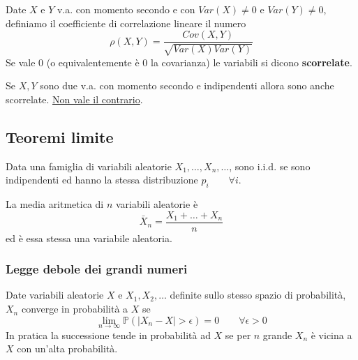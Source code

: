 \begin{definition}
	Date $X$ e $Y$ v.a. con momento secondo e con $Var(X) \neq 0$ e $Var(Y) \neq 0$, definiamo il coefficiente di correlazione lineare il numero
	\begin{equation}
		\rho(X,Y) = \frac{Cov(X,Y)}{\sqrt{Var(X)Var(Y)}}
	\end{equation}
	Se vale $0$ (o equivalentemente è $0$ la covarianza) le variabili si dicono \textbf{scorrelate}.
\end{definition}

\begin{proposition}
	Se $X,Y$ sono due v.a. con momento secondo e indipendenti allora sono anche scorrelate. \underline{Non vale il contrario}.
\end{proposition}

\subsection{Teoremi limite}
\begin{definition}
	Data una famiglia di variabili aleatorie $X_1, \ldots, X_n, \ldots$, sono i.i.d. se sono indipendenti ed hanno la stessa distribuzione $p_i \qquad \forall i$.
\end{definition}

\begin{definition}
	La media aritmetica di $n$ variabili aleatorie è
	\begin{equation}
		\bar{X}_n = \frac{X_1 + \ldots + X_n}{n}
	\end{equation}
	ed è essa stessa una variabile aleatoria.
\end{definition}

\subsubsection{Legge debole dei grandi numeri}
\begin{proposition}
	Date variabili aleatorie $X$ e $X_1, X_2, \ldots$ definite sullo stesso spazio di probabilità, $X_n$ converge in probabilità a $X$ se
	\begin{equation}
		\lim_{n \to \infty}\mathbb{P}(\lvert X_n - X \rvert > \epsilon ) = 0 \quad\quad \forall\epsilon > 0
	\end{equation}
	In pratica la successione tende in probabilità ad $X$ se per $n$ grande $X_n$ è vicina a $X$ con un'alta probabilità.
\end{proposition}

